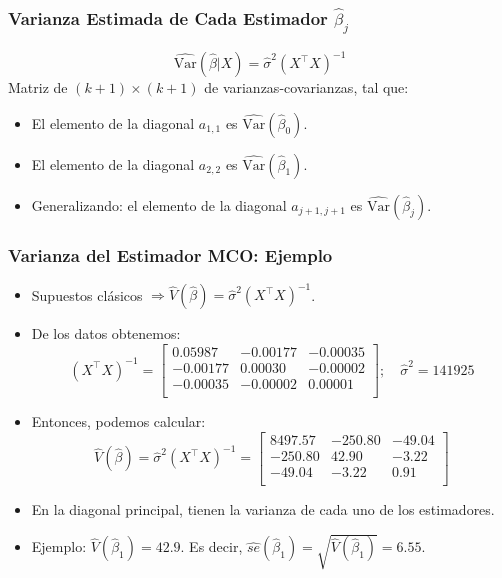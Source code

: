 \documentclass{beamer}
\begin{document}
 \begin{frame}
\frametitle{Varianza Estimada de Cada Estimador $\hat{\beta}_j$}

\[
\hat{\text{Var}}(\hat{\beta}|X) = \hat{\sigma}^2(X^{\top}X)^{-1}
\]
Matriz de $(k + 1) \times (k + 1)$ de varianzas-covarianzas, tal que:
\begin{itemize}
    \item El elemento de la diagonal $a_{1,1}$ es $\hat{\text{Var}}(\hat{\beta}_0)$.
    \item El elemento de la diagonal $a_{2,2}$ es $\hat{\text{Var}}(\hat{\beta}_1)$.
    \item Generalizando: el elemento de la diagonal $a_{j+1,j+1}$ es $\hat{\text{Var}}(\hat{\beta}_j)$.
\end{itemize}
\end{frame}

\begin{frame}
 \frametitle{Varianza del Estimador MCO: Ejemplo}
\begin{itemize}
    \item Supuestos clásicos $\Rightarrow \hat{V}(\hat{\beta}) = \hat{\sigma}^2(X^{\top}X)^{-1}$.
    \item De los datos obtenemos:
    \[
    (X^{\top}X)^{-1} =
    \begin{bmatrix}
    0.05987 & -0.00177 & -0.00035 \\
    -0.00177 & 0.00030 & -0.00002 \\
    -0.00035 & -0.00002 & 0.00001 \\
    \end{bmatrix}; \quad \hat{\sigma}^2 = 141925
    \]
    \item Entonces, podemos calcular:
    \[
    \hat{V}(\hat{\beta}) = \hat{\sigma}^2(X^{\top}X)^{-1} =
    \begin{bmatrix}
    8497.57 & -250.80 & -49.04 \\
    -250.80 & 42.90 & -3.22 \\
    -49.04 & -3.22 & 0.91 \\
    \end{bmatrix}
    \]
    \item En la diagonal principal, tienen la varianza de cada uno de los estimadores.
      \item Ejemplo: $\hat{V}(\hat{\beta}_1) = 42.9$. Es decir, $\hat{se}(\hat{\beta}_1) = \sqrt{\hat{V}(\hat{\beta}_1)} = 6.55$.
\end{itemize}
\end{frame}
\end{document}
